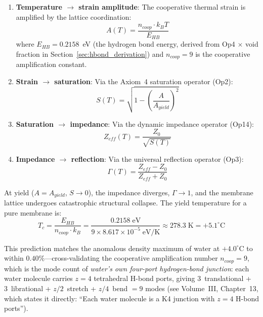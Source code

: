 \begin{enumerate}
    \item \textbf{Temperature $\to$ strain amplitude}: The cooperative thermal strain is amplified by the lattice coordination:
    \begin{equation}
        A(T) = \frac{n_{coop} \cdot k_B T}{E_{HB}}
        \label{eq:cooperative_strain}
    \end{equation}
    where $E_{HB} = 0.2158$~eV (the hydrogen bond energy, derived from Op4 $\times$ void fraction in Section~\ref{sec:hbond_derivation}) and $n_{coop} = 9$ is the cooperative amplification constant.
    
    \item \textbf{Strain $\to$ saturation}: Via the Axiom~4 saturation operator (Op2):
    \begin{equation}
        S(T) = \sqrt{1 - \left(\frac{A}{A_{yield}}\right)^2}
    \end{equation}
    
    \item \textbf{Saturation $\to$ impedance}: Via the dynamic impedance operator (Op14):
    \begin{equation}
        Z_{eff}(T) = \frac{Z_0}{\sqrt{S(T)}}
    \end{equation}
    
    \item \textbf{Impedance $\to$ reflection}: Via the universal reflection operator (Op3):
    \begin{equation}
        \Gamma(T) = \frac{Z_{eff} - Z_0}{Z_{eff} + Z_0}
    \end{equation}
\end{enumerate}

At yield ($A = A_{yield}$, $S \to 0$), the impedance diverges, $\Gamma \to 1$\gammaundeclared{}, and the membrane lattice undergoes catastrophic structural collapse. The yield temperature for a pure membrane is:
\begin{equation}
    T_c = \frac{E_{HB}}{n_{coop} \cdot k_B} = \frac{0.2158\;\text{eV}}{9 \times 8.617 \times 10^{-5}\;\text{eV/K}} \approx 278.3\;\text{K} = +5.1^\circ\text{C}
    \label{eq:T_c_membrane}
\end{equation}

This prediction matches the anomalous density maximum of water at $+4.0^\circ$C to within $0.40\%$---cross-validating the cooperative amplification number $n_{coop} = 9$, which is the mode count of \emph{water's own four-port hydrogen-bond junction}: each water molecule carries $z = 4$ tetrahedral H-bond ports, giving 3~translational + 3~librational + $z/2$~stretch + $z/4$~bend $= 9$ modes (see Volume~III, Chapter~13, which states it directly: ``Each water molecule is a K4 junction with $z = 4$ H-bond ports'').

